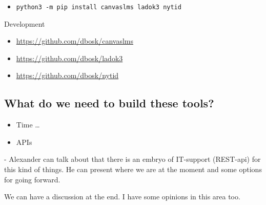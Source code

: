 \begin{frame}[fragile]
  \begin{example}[Installation]
    \begin{itemize}
      \item \texttt{python3 -m pip install canvaslms ladok3 nytid}
    \end{itemize}
  \end{example}

  \pause

  \begin{block}{Development}
    \begin{itemize}
      \item \url{https://github.com/dbosk/canvaslms}
      \item \url{https://github.com/dbosk/ladok3}
      \item \url{https://github.com/dbosk/nytid}
    \end{itemize}
  \end{block}
\end{frame}

\subsection{What do we need to build these tools?}

\begin{frame}[fragile]
  \begin{example}
    \begin{itemize}
      \item Time \dots
      \item \alert<2>{APIs}
    \end{itemize}
  \end{example}
\end{frame}

- Alexander can talk about that there is an embryo of IT-support
(REST-api) for this kind of things. He can present where we are at the
moment and some options for going forward.

We can have a discussion at the end. I have some opinions in this area
too.

